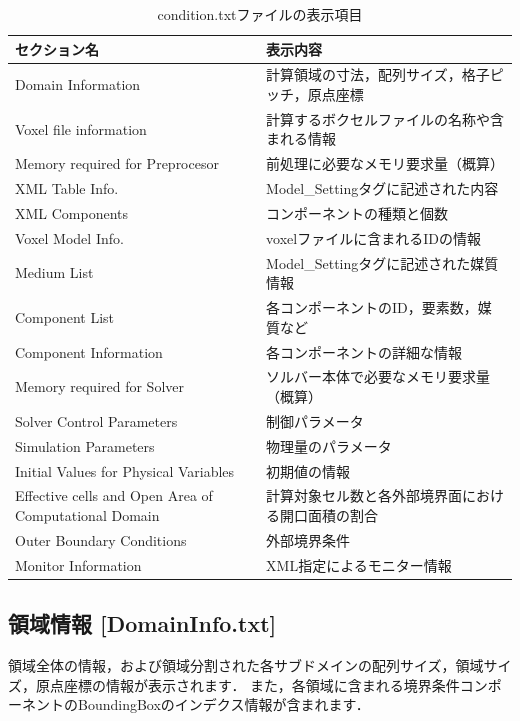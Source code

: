 \begin{table}[htdp]
\caption{condition.txtファイルの表示項目}
\begin{center}
\small
\begin{tabular}{ll}\toprule
セクション名 & 表示内容\\ \midrule
Domain Information & 計算領域の寸法，配列サイズ，格子ピッチ，原点座標\\
Voxel file information & 計算するボクセルファイルの名称や含まれる情報\\
Memory required for Preprocesor & 前処理に必要なメモリ要求量（概算）\\
XML Table Info. & Model\_Settingタグに記述された内容\\
XML Components & コンポーネントの種類と個数\\
Voxel Model Info. & voxelファイルに含まれるIDの情報\\
Medium List & Model\_Settingタグに記述された媒質情報\\
Component List & 各コンポーネントのID，要素数，媒質など\\
Component Information & 各コンポーネントの詳細な情報\\
Memory required for Solver & ソルバー本体で必要なメモリ要求量（概算）\\
Solver Control Parameters & 制御パラメータ\\
Simulation Parameters & 物理量のパラメータ\\
Initial Values for Physical Variables & 初期値の情報\\
Effective cells and Open Area of Computational Domain& 計算対象セル数と各外部境界面における開口面積の割合\\
Outer Boundary Conditions & 外部境界条件\\ 
Monitor Information & XML指定によるモニター情報\\ \bottomrule
\end{tabular}
\end{center}
\label{tbl:log-section}
\end{table}

%
\pagebreak
\subsection{領域情報 [DomainInfo.txt]}
領域全体の情報，および領域分割された各サブドメインの配列サイズ，領域サイズ，原点座標の情報が表示されます．
また，各領域に含まれる境界条件コンポーネントのBoundingBoxのインデクス情報が含まれます．

